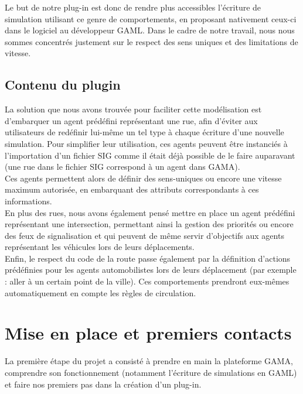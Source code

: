 \documentclass[11pt]{report} %
\begin{document}
Le but de notre plug-in est donc de rendre plus accessibles l'\'ecriture de simulation utilisant ce genre de comportements, en proposant nativement ceux-ci dans le logiciel au d\'eveloppeur GAML. Dans le cadre de notre travail, nous nous sommes concentr\'es justement sur le respect des sens uniques et des limitations de vitesse.

\section{Contenu du plugin}
La solution que nous avons trouv\'ee pour faciliter cette mod\'elisation est d'embarquer un agent pr\'ed\'efini repr\'esentant une rue, afin d'\'eviter aux utilisateurs de red\'efinir lui-m\^eme un tel type \`a chaque \'ecriture d'une nouvelle simulation. Pour simplifier leur utilisation, ces agents peuvent \^etre instanci\'es \`a l'importation d'un fichier SIG comme il \'etait d\'ej\`a possible de le faire auparavant (une rue dans le fichier SIG correspond \`a un agent dans GAMA).\\
Ces agents permettent alors de d\'efinir des sens-uniques ou encore une vitesse maximum autoris\'ee, en embarquant des attributs correspondants \`a ces informations.\\
En plus des rues, nous avons \'egalement pens\'e mettre en place un agent pr\'ed\'efini repr\'esentant une intersection, permettant ainsi la gestion des priorit\'es ou encore des feux de signalisation et qui peuvent de m\^eme servir d'objectifs aux agents repr\'esentant les v\'ehicules lors de leurs d\'eplacements.\\
Enfin, le respect du code de la route passe \'egalement par la d\'efinition d'actions pr\'ed\'efinies pour les agents automobilistes lors de leurs d\'eplacement (par exemple : aller \`a un certain point de la ville). Ces comportements prendront eux-m\^emes automatiquement en compte les r\`egles de circulation.	

\chapter{Mise en place et premiers contacts}
La premi\`ere \'etape du projet a consist\'e \`a prendre en main la plateforme GAMA, comprendre son fonctionnement (notamment l'\'ecriture de simulations en GAML) et faire nos premiers pas dans la cr\'eation d'un plug-in. 
\end{document}
